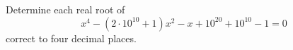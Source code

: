Determine each real root of \[x^4-(2\cdot10^{10}+1)x^2-x+10^{20}+10^{10}-1=0\]correct to four decimal places.